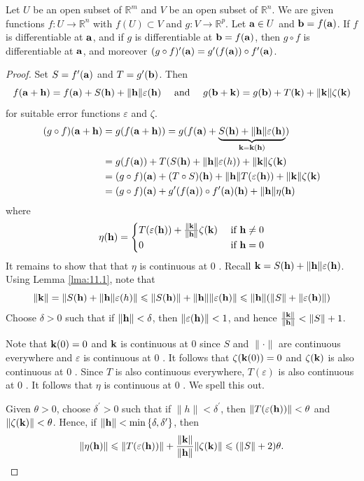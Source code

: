 \documentclass[a4paper]{article}
\begin{document}
\begin{proposition}
    Let $U$ be an open subset of $\mathbb{R}^{m}$ and $V$ be an open subset of $\mathbb{R}^{n}$. We are given functions $f: U \rightarrow \mathbb{R}^{n}$ with $f(U) \subset V$ and $g: V \rightarrow \mathbb{R}^{p}$. Let ${\bf a} \in U$ and ${\bf b}=f({\bf a})$. If $f$ is differentiable at ${\bf a}$, and if $g$ is differentiable at ${\bf b}=f({\bf a})$, then $g \circ f$ is differentiable at ${\bf a}$, and moreover $(g \circ f)^{\prime}({\bf a})=g^{\prime}(f({\bf a})) \circ f^{\prime}({\bf a})$.
\end{proposition}
\begin{proof}
    Set $S=f^{\prime}({\bf a})$ and $T=g^{\prime}({\bf b})$. Then
$$
f({\bf a}+{\bf h})=f({\bf a})+S({\bf h})+\|{\bf h}\| \varepsilon({\bf h}) \quad \text { and } \quad g({\bf b}+{\bf k})=g({\bf b})+T({\bf k})+\|{\bf k}\| \zeta({\bf k})
$$
for suitable error functions $\varepsilon$ and $\zeta$.
\begin{align*}
    (g \circ f)({\bf a}+{\bf h}) &=g(f({\bf a}+{\bf h}))=g(f({\bf a})+\underbrace{S({\bf h})+\|{\bf h}\| \varepsilon({\bf h})}_{{\bf k}={\bf k}({\bf h})}) \\
    &=g(f({\bf a}))+T(S({\bf h})+\|{\bf h}\| \varepsilon(h))+\|{\bf k}\| \zeta({\bf k}) \\
    &=(g \circ f)({\bf a})+(T \circ S)({\bf h})+\|{\bf h}\| T(\varepsilon({\bf h}))+\|{\bf k}\| \zeta({\bf k}) \\
    &=(g \circ f)({\bf a})+g^{\prime}(f({\bf a})) \circ f^{\prime}({\bf a})({\bf h})+\|{\bf h}\| \eta({\bf h})
    \end{align*}
    where
    \[
        \eta({\bf h})= \begin{cases}T(\varepsilon({\bf h}))+\frac{\|{\bf k}\|}{\|{\bf h}\|} \zeta({\bf k}) & \text { if } {\bf h} \neq 0 \\ 0 & \text { if } {\bf h}=0\end{cases}
    \]
    It remains to show that that $\eta$ is continuous at 0 . Recall ${\bf k}=S({\bf h})+\|{\bf h}\| \varepsilon({\bf h})$. Using Lemma \ref{lma:11.1}, note that
$$
\|{\bf k}\|=\|S({\bf h})+\| {\bf h}\|\varepsilon(h)\| \leqslant\|S({\bf h})\|+\|{\bf h}\|\|\varepsilon({\bf h})\| \leqslant\|{\bf h}\|(\|S\|+\|\varepsilon({\bf h})\|)
$$
Choose $\delta>0$ such that if $\|{\bf h}\|<\delta$, then $\|\varepsilon({\bf h})\|<1$, and hence $\frac{\|{\bf k}\|}{\|{\bf h}\|}<\|S\|+1$.

Note that ${\bf k}(0)=0$ and ${\bf k}$ is continuous at 0 since $S$ and $\|\cdot\|$ are continuous everywhere and $\varepsilon$ is continuous at 0 . It follows that $\zeta({\bf k}(0))=0$ and $\zeta({\bf k})$ is also continuous at 0 . Since $T$ is also continuous everywhere, $T(\varepsilon)$ is also continuous at 0 . It follows that $\eta$ is continuous at 0 . We spell this out.

Given $\theta>0$, choose $\delta^{\prime}>0$ such that if $\|h\|<\delta^{\prime}$, then $\|T(\varepsilon({\bf h}))\|<\theta$ and $\|\zeta({\bf k})\|<\theta$. Hence, if $\|{\bf h}\|<\min \left\{\delta, \delta^{\prime}\right\}$, then
\[
\|\eta({\bf h})\| \leqslant\|T(\varepsilon({\bf h}))\|+\frac{\|{\bf k}\|}{\|{\bf h}\|}\|\zeta({\bf k})\| \leqslant(\|S\|+2) \theta.\qedhere
\]
\end{proof}
\end{document}
